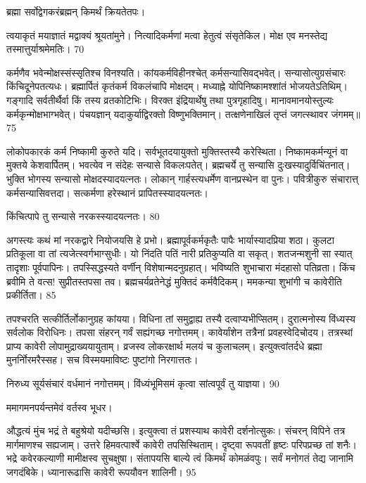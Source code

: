 ब्रह्मा
सर्वोद्वेगकरंब्रह्मन् किमर्थं क्रियतेतपः।

त्वयाकृतं मयाज्ञातं मद्वाक्यं श्रूयतांमुने।
 नित्यादिकर्मणां मत्वा हेतुत्वं संसृतेकिल।
 मोक्ष एव मनस्तेद्य तस्मात्तुर्याश्रमेमतिः।
 70

  कर्मणैव भवेन्मोक्षस्संस्सृतिश्च विनश्यति।
 कांयकर्मविहीनश्चेत् कर्मसन्यासिवद्भवेत्।
 सन्यासोत्युग्रसंचारः किंचिदूनेपतत्यधः।
 ब्रह्मार्पितं कृतंकर्म विकलंचापि मोक्षदम्।
 मध्याह्ने योपिनिष्कामश्शांतं भोजयतेऽतिथिम्।
 गङ्गादि सर्वतीर्थैर्वा किं तस्य व्रतकोटिभिः।
 विरक्त इंद्रियार्थेषु तथा पुत्रगृहादिषु।
 मानावमानयोस्तुल्यः कर्मकृन्मोक्षभाग्भवेत्।
 पंचयज्ञान् यदाकुर्याद्विरक्तो विष्णुभक्तिमान्।
 तत्क्षणेनाखिलं तृप्तं जगत्स्थावर जंगमम्॥75

  लोकोपकारकं कर्म निष्कामी कुरुते यदि।
 सर्वभूतदयायुक्तो मुक्तिस्तस्यै करेस्थिता।
 निष्कामकर्मन्यूनं वा मुक्तये केशवार्पितम्।
 भवत्येव न संदेहः सन्यासे विकलःपतेत्।
 ब्रह्मचर्ये तु सन्यासि दुःखस्यादुर्विचिंतनात्।
 भुक्ति भोगस्य सन्यासो मोक्षदस्यादयत्नतः।
 लोकान् गार्हस्त्यधर्मेण वानप्रस्थेन वा पुनः।
 पवित्रीकुरु संचारात्त् कर्मसन्यासिवत्तदा।
 सत्कर्मणा हरेस्थानं प्रापितस्स्यादयत्नतः।
 
किंचित्पापे तु सन्यासे नरकस्स्यादयत्नतः।
 80

 
अगस्त्यः
कथं मां नरकद्वारे नियोजयसि हे प्रभो।
 ब्रह्मापूर्वकर्मकृतैः पापैः भार्यास्यादप्रिया शठा।
 कुलटा प्रतिकूला वा तां त्यजेत्स्वर्गभाग्सुधीः।
 यो निंदति पतिं नारी प्रतिकुप्यति वा सकृत्।
 शतजन्मशुनी सा स्यात् तादृशाः पूर्वपापिनः।
 तपस्सिद्धस्यते वर्णीन् विशेषान्मदनुग्रहात्।
 भविष्यति शुभाचारा मंदहासो पतिव्रता।
 किंच ब्रवीमि ते वत्स! सुप्रीतस्तपसा तव।
 ब्रह्मचर्यव्रतेनेद्धं मुक्तिदं कर्मवैदिकम्।
 ममकन्या शुभांगी च कावेरीति प्रकीर्तिता।
 85

  तपश्चरति सत्कीर्तिर्लोकानुग्रह कांयया।
 विधिना तां समुद्वाह्य तस्यै दत्वाप्यभीप्सितम्।
 दुरात्मनोस्य विंध्यस्य सर्वलोक विरोधिनः।
 तपसा संहरन् गर्वं सह्यंगच्छ नगोत्तमम्।
 कावेर्यांशेन तत्रैनां प्रवहस्वेदिचोदय।
 तत्रस्थां प्राप्य कावेरी लोपामुद्राख्ययायुताम्।
 व्रजस्व लोकरक्षार्थ मलयं च कुलाचलम्।
 इत्युक्त्वांतर्दधे ब्रह्मा मुनर्नोिरमरैस्सह।
 सच विस्मयमाविष्टः पुष्टांगो निरगात्ततः।
 
निरुध्य सूर्यसंचारं वर्धमानं नगोत्तमम्।
 विंध्यंभूमिसमं कृत्वा सांत्वपूर्वं तु याज्ञया।
 90

  ममागमनपर्यन्तमेवं वर्तस्व भूधर।

औद्धत्यं मुंच भद्रं ते बहुश्रेयो यदीच्छसि।
 इत्युक्त्वा तं प्रशस्याथ कावेरी दर्शनोत्सुकः।
 संचरन् विपिने तत्र मार्गमाणश्च सह्यजाम्।
 उत्तरे हिमवत्पार्श्वे कावेरी तपसिस्थिताम्।
 दृष्ट्वा रूपवतीं हृष्टः परिपप्रच्छ तां शनैः।
 भद्रे कवेरकल्याणी मामीक्षस्व सुचक्षुषा।
 संतापयसि बाल्ये त्वं किमर्थं कोमळंवपुः।
 सर्वं मनोगतं तेद्य जानामि जगदंबिके।
 ध्यानारूढासि कावेरी रूपयौवन शालिनी।
 95

